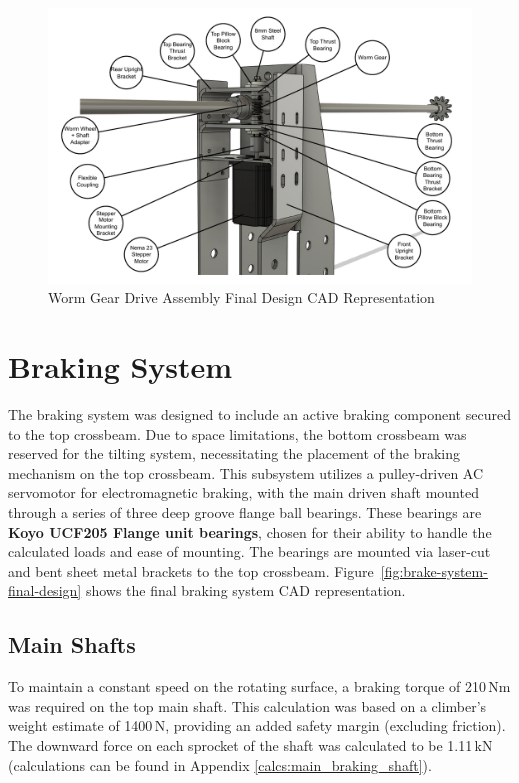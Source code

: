 \begin{figure}[H]
    \centering
    \includegraphics[width=1\linewidth]{figs/final_design/wormgear_assembly_CAD.pdf}
    \caption{Worm Gear Drive Assembly Final Design CAD Representation}
    \label{fig:worm-gear-drive-cad}
\end{figure}


\section{Braking System}

The braking system was designed to include an active braking component secured to the top crossbeam. Due to space limitations, the bottom crossbeam was reserved for the tilting system, necessitating the placement of the braking mechanism on the top crossbeam. This subsystem utilizes a pulley-driven AC servomotor for electromagnetic braking, with the main driven shaft mounted through a series of three deep groove flange ball bearings. These bearings are \textbf{Koyo UCF205 Flange unit bearings}, chosen for their ability to handle the calculated loads and ease of mounting. The bearings are mounted via laser-cut and bent sheet metal brackets to the top crossbeam. Figure~\ref{fig:brake-system-final-design} shows the final braking system CAD representation.

\subsection{Main Shafts}

To maintain a constant speed on the rotating surface, a braking torque of 210\,Nm was required on the top main shaft. This calculation was based on a climber’s weight estimate of 1400\,N, providing an added safety margin (excluding friction). The downward force on each sprocket of the shaft was calculated to be 1.11\,kN (calculations can be found in Appendix \ref{calcs:main_braking_shaft}).

